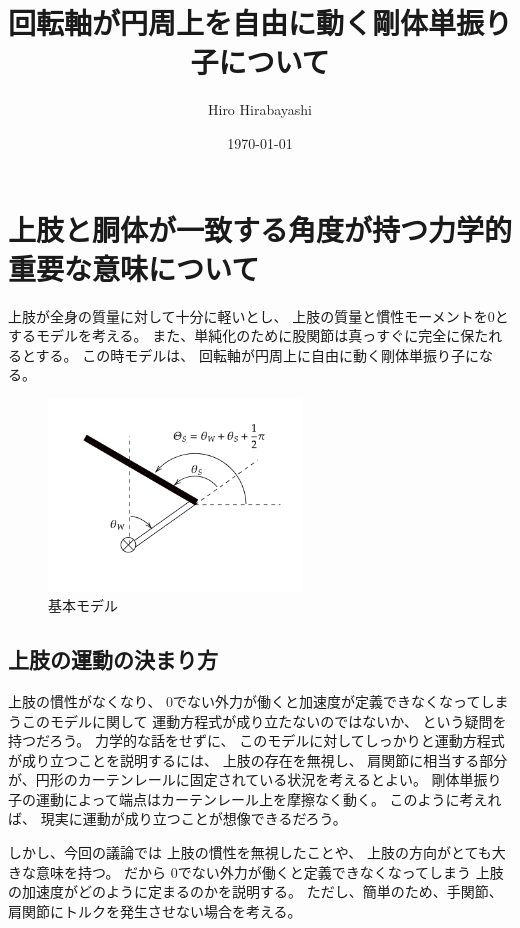 \documentclass[a4paper,11pt]{jsarticle}
\begin{document}
\title{回転軸が円周上を自由に動く剛体単振り子について}
\author{Hiro Hirabayashi}
\date{\today}
\maketitle

\section{上肢と胴体が一致する角度が持つ力学的重要な意味について}

上肢が全身の質量に対して十分に軽いとし、
上肢の質量と慣性モーメントを$0$とするモデルを考える。
また、単純化のために股関節は真っすぐに完全に保たれるとする。
この時モデルは、
回転軸が円周上に自由に動く剛体単振り子になる。

\begin{figure}[h]
  \centering
  \includegraphics[width = 0.6\textwidth]{config.png}
  \caption{基本モデル}
  \label{config.png}
\end{figure}

\subsection{上肢の運動の決まり方}

上肢の慣性がなくなり、
0でない外力が働くと加速度が定義できなくなってしまうこのモデルに関して
運動方程式が成り立たないのではないか、
という疑問を持つだろう。
力学的な話をせずに、
このモデルに対してしっかりと運動方程式が成り立つことを説明するには、
上肢の存在を無視し、
肩関節に相当する部分が、円形のカーテンレールに固定されている状況を考えるとよい。
剛体単振り子の運動によって端点はカーテンレール上を摩擦なく動く。
このように考えれば、
現実に運動が成り立つことが想像できるだろう。

しかし、今回の議論では
上肢の慣性を無視したことや、
上肢の方向がとても大きな意味を持つ。
だから
0でない外力が働くと定義できなくなってしまう
上肢の加速度がどのように定まるのかを説明する。
ただし、簡単のため、手関節、肩関節にトルクを発生させない場合を考える。
\end{document}
